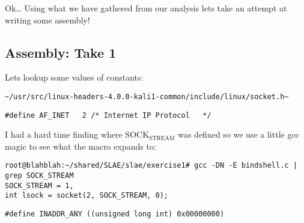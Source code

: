 \documentclass[11pt]{article}
\begin{document}
Ok\ldots{} Using what we have gathered from our analysis lets take an attempt at
writing some assembly!

\subsection{Assembly: Take 1}
\label{sec-1-5}

Lets lookup some values of constants:

\begin{verbatim}
~/usr/src/linux-headers-4.0.0-kali1-common/include/linux/socket.h~
\end{verbatim}

\begin{verbatim}
#define AF_INET   2 /* Internet IP Protocol   */
\end{verbatim}

I had a hard time finding where SOCK$_{\text{STREAM}}$ was defined so we use
a little gcc magic to see what the macro expands to:

\begin{verbatim}
root@blahblah:~/shared/SLAE/slae/exercise1# gcc -DN -E bindshell.c | grep SOCK_STREAM
SOCK_STREAM = 1,
int lsock = socket(2, SOCK_STREAM, 0);
\end{verbatim}

\begin{verbatim}
#define INADDR_ANY ((unsigned long int) 0x00000000)
\end{verbatim}
\end{document}
